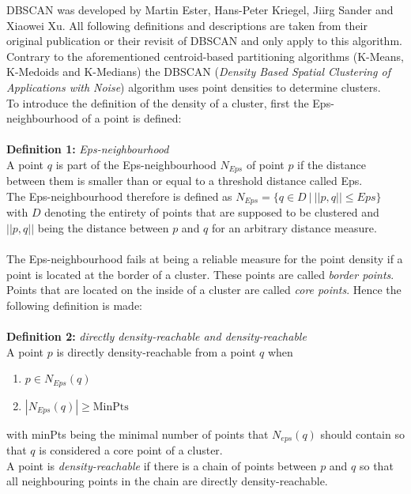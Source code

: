 
DBSCAN was developed by Martin Ester, Hans-Peter Kriegel, Jiirg Sander and Xiaowei Xu. All following definitions and descriptions are taken from their original publication \cite{dbscan} or their revisit of DBSCAN \cite{dbscanrevisited} and only apply to this algorithm.\\
Contrary to the aforementioned centroid-based partitioning algorithms (K-Means, K-Medoids and K-Medians) the DBSCAN (\textit{Density Based Spatial Clustering of Applications with Noise}) algorithm uses point densities to determine clusters.\\
To introduce the definition of the density of a cluster, first the Eps-neighbourhood of a point is defined:\\
\ \\
\textbf{Definition 1:} \textit{Eps-neighbourhood}\\
A point $q$ is part of the Eps-neighbourhood $N_{Eps}$ of point $p$ if the distance between them is smaller than or equal to a threshold distance called Eps.\\
The Eps-neighbourhood therefore is defined as $N_{Eps} = \{q \in D \ | \ ||p, q|| \leq Eps \}$ with $D$ denoting the entirety of points that are supposed to be clustered and $||p, q||$ being the distance between $p$ and $q$ for an arbitrary distance measure.\\
\ \\
The Eps-neighbourhood fails at being a reliable measure for the point density if a point is located at the border of a cluster. These points are called \textit{border points}. Points that are located on the inside of a cluster are called \textit{core points}. Hence the following definition is made:\\
\ \\
\textbf{Definition 2:} \textit{directly density-reachable and density-reachable}\\
A point $p$ is directly density-reachable from a point $q$ when
\begin{enumerate}
    \item $p \in N_{Eps}(q)$
    \item $|N_{Eps}(q)| \geq \text{MinPts}$
\end{enumerate}
with \acrshort{minPts} being the minimal number of points that $N_{eps}(q)$ should contain so that $q$ is considered a core point of a cluster.\\
A point is \textit{density-reachable} if there is a chain of points between $p$ and $q$ so that all neighbouring points in the chain are directly density-reachable.\\

